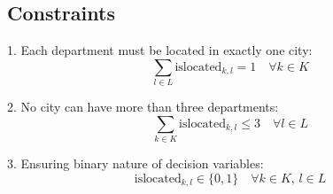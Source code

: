 \documentclass{article}
\begin{document}
\subsection*{Constraints}
1. Each department must be located in exactly one city:
\[
\sum_{l \in L} \text{islocated}_{k,l} = 1 \quad \forall k \in K
\]

2. No city can have more than three departments:
\[
\sum_{k \in K} \text{islocated}_{k,l} \leq 3 \quad \forall l \in L
\]

3. Ensuring binary nature of decision variables:
\[
\text{islocated}_{k,l} \in \{0, 1\} \quad \forall k \in K, \, l \in L
\]
\end{document}
